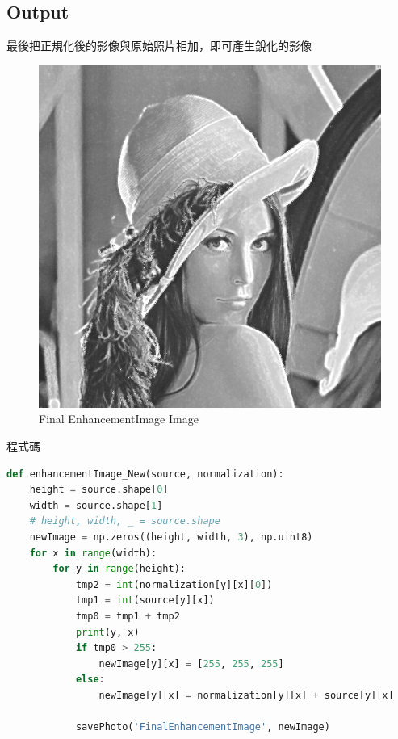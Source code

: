 \documentclass[12pt,a4paper]{article}
\begin{document}
\subsection{Output}
{
最後把正規化後的影像與原始照片相加，即可產生銳化的影像
\begin{figure}[ht]
\centering
\includegraphics[width=.4\textwidth]{image/FinalEnhancementImage.png}
\caption{Final EnhancementImage Image}%
\label{要合併的兩張圖}%
\end{figure}

程式碼
\begin{lstlisting}[language=Python]
def enhancementImage_New(source, normalization):
    height = source.shape[0]
    width = source.shape[1]
    # height, width, _ = source.shape
    newImage = np.zeros((height, width, 3), np.uint8)
    for x in range(width):
        for y in range(height):
            tmp2 = int(normalization[y][x][0])
            tmp1 = int(source[y][x])
            tmp0 = tmp1 + tmp2
            print(y, x)
            if tmp0 > 255:
                newImage[y][x] = [255, 255, 255]
            else:
                newImage[y][x] = normalization[y][x] + source[y][x]

            savePhoto('FinalEnhancementImage', newImage)
    
\end{lstlisting}
}
\end{document}
